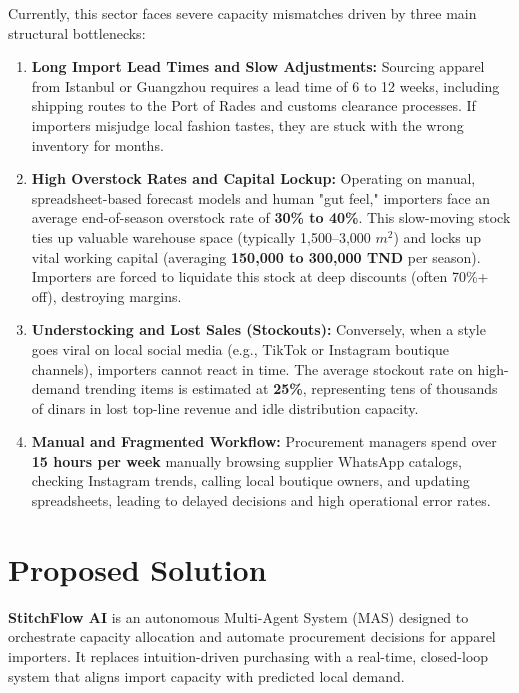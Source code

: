 \documentclass[11pt,a4paper]{article}
\begin{document}
Currently, this sector faces severe capacity mismatches driven by three main structural bottlenecks:
\begin{enumerate}
    \item \textbf{Long Import Lead Times and Slow Adjustments:} Sourcing apparel from Istanbul or Guangzhou requires a lead time of 6 to 12 weeks, including shipping routes to the Port of Rades and customs clearance processes. If importers misjudge local fashion tastes, they are stuck with the wrong inventory for months.
    \item \textbf{High Overstock Rates and Capital Lockup:} Operating on manual, spreadsheet-based forecast models and human "gut feel," importers face an average end-of-season overstock rate of \textbf{30\% to 40\%}. This slow-moving stock ties up valuable warehouse space (typically 1,500--3,000 $m^2$) and locks up vital working capital (averaging \textbf{150,000 to 300,000 TND} per season). Importers are forced to liquidate this stock at deep discounts (often 70\%+ off), destroying margins.
    \item \textbf{Understocking and Lost Sales (Stockouts):} Conversely, when a style goes viral on local social media (e.g., TikTok or Instagram boutique channels), importers cannot react in time. The average stockout rate on high-demand trending items is estimated at \textbf{25\%}, representing tens of thousands of dinars in lost top-line revenue and idle distribution capacity.
    \item \textbf{Manual and Fragmented Workflow:} Procurement managers spend over \textbf{15 hours per week} manually browsing supplier WhatsApp catalogs, checking Instagram trends, calling local boutique owners, and updating spreadsheets, leading to delayed decisions and high operational error rates.
\end{enumerate}

\section{Proposed Solution}
\textbf{StitchFlow AI} is an autonomous Multi-Agent System (MAS) designed to orchestrate capacity allocation and automate procurement decisions for apparel importers. It replaces intuition-driven purchasing with a real-time, closed-loop system that aligns import capacity with predicted local demand.
\end{document}
